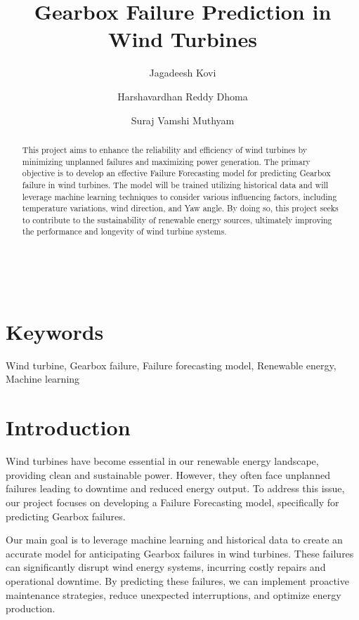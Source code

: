 \documentclass[11pt,a4paper]{article}
\title{\textbf{Gearbox Failure Prediction in Wind Turbines}}
\author{
    Jagadeesh Kovi \\
    \and
    Harshavardhan Reddy Dhoma \\
    \and
    Suraj Vamshi Muthyam \\
}
\date{}
\begin{document}
\maketitle

{ \\} %
\vspace{1cm} %

\begin{abstract}

This project aims to enhance the reliability and efficiency of wind turbines by minimizing unplanned failures and maximizing power generation. The primary objective is to develop an effective Failure Forecasting model for predicting Gearbox failure in wind turbines. The model will be trained utilizing historical data and will leverage machine learning techniques to consider various influencing factors, including temperature variations, wind direction, and Yaw angle. By doing so, this project seeks to contribute to the sustainability of renewable energy sources, ultimately improving the performance and longevity of wind turbine systems.

\end{abstract}

\section*{Keywords}
Wind turbine, Gearbox failure, Failure forecasting model, Renewable energy, Machine learning

\section{Introduction}
Wind turbines have become essential in our renewable energy landscape, providing clean and sustainable power. However, they often face unplanned failures leading to downtime and reduced energy output. To address this issue, our project focuses on developing a Failure Forecasting model, specifically for predicting Gearbox failures.

Our main goal is to leverage machine learning and historical data to create an accurate model for anticipating Gearbox failures in wind turbines. These failures can significantly disrupt wind energy systems, incurring costly repairs and operational downtime. By predicting these failures, we can implement proactive maintenance strategies, reduce unexpected interruptions, and optimize energy production.
\end{document}
